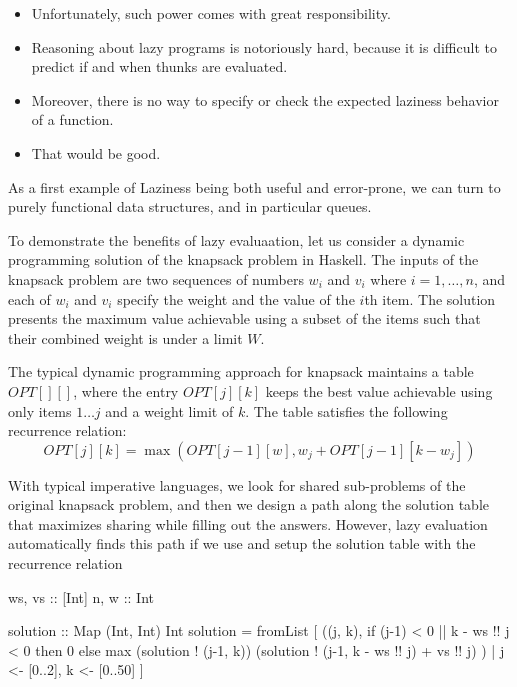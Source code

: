 \documentclass[acmsmall,review]{acmart}\settopmatter{}
\begin{document}

\begin{itemize}
\item Unfortunately, such power comes with great responsibility.
\item Reasoning about lazy programs is notoriously hard, because
it is difficult to predict if and when thunks are evaluated.
\item Moreover, there is  no way to specify or check the expected
laziness behavior of a function.
\item That would be good.
\end{itemize}


As a first example of Laziness being both useful and error-prone, we can turn to
purely functional data structures\cn, and in particular queues.


To demonstrate the benefits of lazy evaluaation, let us consider a dynamic
programming solution of the knapsack problem in Haskell.
%
The inputs of the knapsack problem are two sequences of numbers $w_i$ and $v_i$
where $i = 1, \dots, n$, and each of $w_i$ and $v_i$ specify the weight and the
value of the $i$th item. The solution presents the maximum value achievable
using a subset of the items such that their combined weight is under a limit
$W$.

The typical dynamic programming approach for knapsack maintains a table $OPT[][]$,
where the entry $OPT[j][k]$ keeps the best value achievable using only items
$1\dots j$ and a weight limit of $k$. The table satisfies the following
recurrence relation: $$OPT[j][k] = \max(OPT[j-1][w], w_j + OPT[j-1][k-w_j])$$

With typical imperative languages, we look for shared sub-problems of the
original knapsack problem, and then we design a path along the solution table
that maximizes sharing while filling out the answers.
%
However, lazy evaluation automatically finds this path if we
use  and setup the solution table with the recurrence
relation 
\begin{inlinecode}
ws, vs :: [Int]
n,  w  :: Int

solution :: Map (Int, Int) Int
solution = fromList [ ((j, k),
                       if (j-1) < 0 || k - ws !! j < 0
                       then 0
                       else max (solution ! (j-1, k))
                                (solution ! (j-1, k - ws !! j) + vs !! j)
                      )
                    | j <- [0..2], k <- [0..50] ]
\end{inlinecode}
\end{document}
